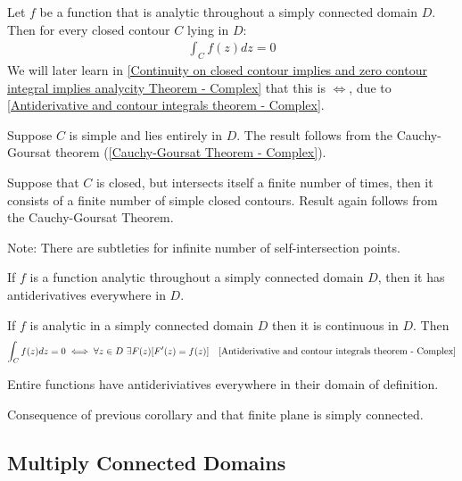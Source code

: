 \documentclass[12pt, english]{book}
\makeatletter
\renewenvironment{proof}[1][\proofname]{\par
	\pushQED{\qed}%
	\normalfont \topsep6\p@\@plus6\p@\relax
	\list{}{%
		\settowidth{\leftmargin}{\itshape\proofname:\hskip\labelsep}%
		\setlength{\labelwidth}{0pt}%
		\setlength{\itemindent}{-\leftmargin}%
	}%
	\item[\hskip\labelsep\itshape#1\@addpunct{:}]\ignorespaces
}{%
	\popQED\endlist\@endpefalse
}
\makeatother
\begin{document}
	\begin{theorem}
		\label{Contour integral in simply connected domain Theorem - Complex}
		Let \(f\) be a function that is analytic throughout a simply connected domain \(D\). Then for every closed contour \(C\) lying in \(D\):
		\begin{align*}
			\int_{C} f(z) dz = 0
		\end{align*}
		We will later learn in \cref{Continuity on closed contour implies and zero contour integral implies analycity Theorem - Complex} that this is \(\iff\), due to \cref{Antiderivative and contour integrals theorem - Complex}.
	\end{theorem}
	\begin{proof}
		Suppose \(C\) is simple and lies entirely in \(D\). The result follows from the Cauchy-Goursat theorem (\cref{Cauchy-Goursat Theorem - Complex}).
		
		Suppose that \(C\) is closed, but intersects itself a finite number of times, then it consists of a finite number of simple closed contours. Result again follows from the Cauchy-Goursat Theorem. 
		
		Note: There are subtleties for infinite number of self-intersection points. 
	\end{proof}

	\begin{corollary}
		If \(f\) is a function analytic throughout a simply connected domain \(D\), then it has antiderivatives everywhere in \(D\).
	\end{corollary}
	\begin{proof}
		If \(f\) is analytic in a simply connected domain \(D\) then it is continuous in \(D\). Then
		\begin{align*}
			\int_{C} f(z) dz = 0 &\iff \forall z \in D \ \exists F(z)[F'(z) = f(z)] 
				&\Cref{Antiderivative and contour integrals theorem - Complex}
		\end{align*}
	\end{proof}

	\begin{corollary}
		Entire functions have antideriviatives everywhere in their domain of definition.
	\end{corollary}
	\begin{proof}
		Consequence of previous corollary and that finite plane is simply connected.
	\end{proof}

	\subsection{Multiply Connected Domains} \label{Multiply Connected Domains Subsection - Complex}
	
\end{document}
